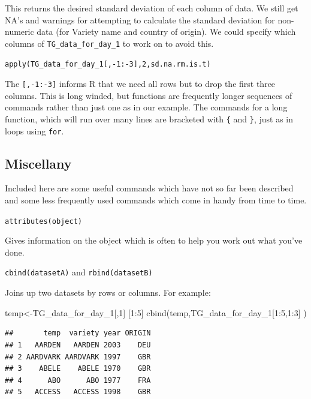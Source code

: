 \documentclass[
]{book}
\newenvironment{Shaded}{\begin{snugshade}}{\end{snugshade}}
\newcommand{\DecValTok}[1]{\textcolor[rgb]{0.00,0.00,0.81}{#1}}
\newcommand{\FunctionTok}[1]{\textcolor[rgb]{0.00,0.00,0.00}{#1}}
\newcommand{\NormalTok}[1]{#1}
\newcommand{\OtherTok}[1]{\textcolor[rgb]{0.56,0.35,0.01}{#1}}
\newcommand{\SpecialCharTok}[1]{\textcolor[rgb]{0.00,0.00,0.00}{#1}}
\begin{document}
This returns the desired standard deviation of each column of data. We still get NA's and warnings for attempting to calculate the standard deviation for non-numeric data (for Variety name and country of origin). We could specify which columns of \texttt{TG\_data\_for\_day\_1} to work on to avoid this.

\texttt{apply(TG\_data\_for\_day\_1{[},-1:-3{]},2,sd.na.rm.is.t)}

The \texttt{{[},-1:-3{]}} informs R that we need all rows but to drop the first three columns.
This is long winded, but functions are frequently longer sequences of commands rather than just one as in our example. The commands for a long function, which will run over many lines are bracketed with \texttt{\{} and \texttt{\}}, just as in loops using \texttt{for}.

\hypertarget{miscellany}{%
\subsection{Miscellany}\label{miscellany}}

Included here are some useful commands which have not so far been described and some less frequently used commands which come in handy from time to time.

\texttt{attributes(object)}

Gives information on the object which is often to help you work out what you've done.

\texttt{cbind(datasetA)} and \texttt{rbind(datasetB)}

Joins up two datasets by rows or columns. For example:

\begin{Shaded}
\begin{Highlighting}[]
\NormalTok{temp}\OtherTok{\textless{}{-}}\NormalTok{TG\_data\_for\_day\_1[,}\DecValTok{1}\NormalTok{] [}\DecValTok{1}\SpecialCharTok{:}\DecValTok{5}\NormalTok{]}
\FunctionTok{cbind}\NormalTok{(temp,TG\_data\_for\_day\_1[}\DecValTok{1}\SpecialCharTok{:}\DecValTok{5}\NormalTok{,}\DecValTok{1}\SpecialCharTok{:}\DecValTok{3}\NormalTok{]  )}
\end{Highlighting}
\end{Shaded}

\begin{verbatim}
##       temp  variety year ORIGIN
## 1   AARDEN   AARDEN 2003    DEU
## 2 AARDVARK AARDVARK 1997    GBR
## 3    ABELE    ABELE 1970    GBR
## 4      ABO      ABO 1977    FRA
## 5   ACCESS   ACCESS 1998    GBR
\end{verbatim}
\end{document}

